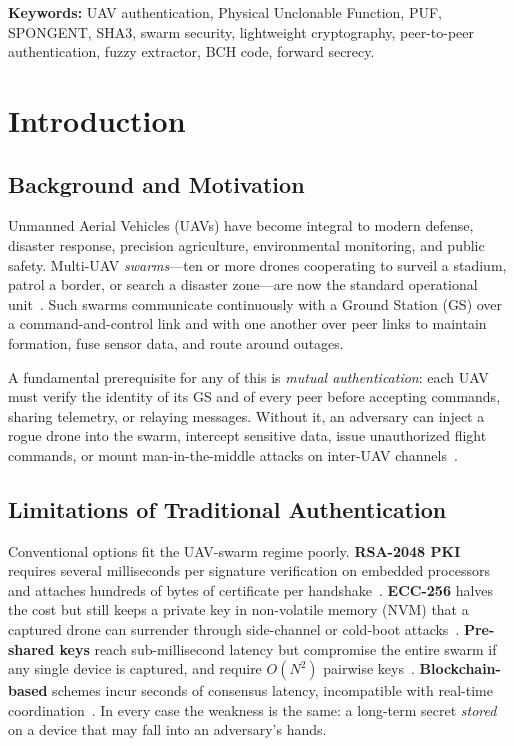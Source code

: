 \documentclass[11pt,a4paper]{article}
\begin{document}
\textbf{Keywords:} UAV authentication, Physical Unclonable Function, PUF,
SPONGENT, SHA3, swarm security, lightweight cryptography, peer-to-peer
authentication, fuzzy extractor, BCH code, forward secrecy.

\newpage
\tableofcontents
\newpage

\section{Introduction}
\label{sec:introduction}

\subsection{Background and Motivation}

Unmanned Aerial Vehicles (UAVs) have become integral to modern defense,
disaster response, precision agriculture, environmental monitoring, and public
safety. Multi-UAV \emph{swarms}---ten or more drones cooperating to surveil a
stadium, patrol a border, or search a disaster zone---are now the standard
operational unit~\cite{securing_uav_fanet}. Such swarms communicate
continuously with a Ground Station (GS) over a command-and-control link and
with one another over peer links to maintain formation, fuse sensor data, and
route around outages.

A fundamental prerequisite for any of this is \emph{mutual authentication}:
each UAV must verify the identity of its GS and of every peer before accepting
commands, sharing telemetry, or relaying messages. Without it, an adversary
can inject a rogue drone into the swarm, intercept sensitive data, issue
unauthorized flight commands, or mount man-in-the-middle attacks on inter-UAV
channels~\cite{puf_uav_cross_domain}.

\subsection{Limitations of Traditional Authentication}

Conventional options fit the UAV-swarm regime poorly. \textbf{RSA-2048 PKI}
requires several milliseconds per signature verification on embedded
processors and attaches hundreds of bytes of certificate per
handshake~\cite{puf_lightweight_uav}. \textbf{ECC-256} halves the cost but
still keeps a private key in non-volatile memory (NVM) that a captured drone
can surrender through side-channel or cold-boot
attacks~\cite{peer2peer_auth}. \textbf{Pre-shared keys} reach sub-millisecond
latency but compromise the entire swarm if any single device is captured, and
require $O(N^2)$ pairwise keys~\cite{puf_iot_strong_adversary}.
\textbf{Blockchain-based} schemes incur seconds of consensus latency,
incompatible with real-time coordination~\cite{puf_ntu}. In every case the
weakness is the same: a long-term secret \emph{stored} on a device that may
fall into an adversary's hands.
\end{document}
